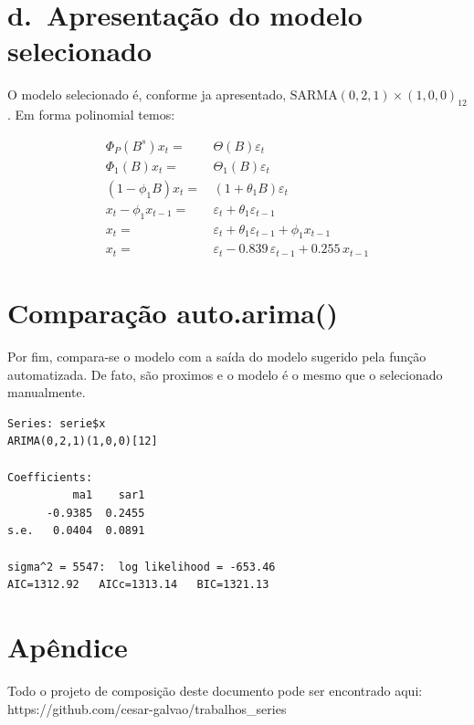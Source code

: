 \documentclass[
  letterpaper,
  DIV=11,
  numbers=noendperiod]{scrartcl}
\begin{document}
\hypertarget{d.-apresentauxe7uxe3o-do-modelo-selecionado}{%
\section{d.~Apresentação do modelo
selecionado}\label{d.-apresentauxe7uxe3o-do-modelo-selecionado}}

O modelo selecionado é, conforme ja apresentado,
\(\text{SARMA}(0,2,1)\times(1,0,0)_{12}\). Em forma polinomial temos:

\[
\begin{aligned}
  \Phi_P(B^s)x_t =& \, \Theta(B)\varepsilon_t \\
  \Phi_1(B)x_t =& \, \Theta_1(B)\varepsilon_t\\
  (1-\phi_1 B)x_t =& \, (1+\theta_1 B)\varepsilon_t \\
  x_t - \phi_1 x_{t-1} =& \, \varepsilon_t  + \theta_1 \varepsilon_{t-1} \\
  x_t  =& \, \varepsilon_t  + \theta_1 \varepsilon_{t-1} + \phi_1 x_{t-1}\\
  x_t  =& \, \varepsilon_t  -0.839 \, \varepsilon_{t-1} + 0.255 \, x_{t-1}
\end{aligned}
\]

\hypertarget{comparauxe7uxe3o-auto.arima}{%
\section{Comparação auto.arima()}\label{comparauxe7uxe3o-auto.arima}}

Por fim, compara-se o modelo com a saída do modelo sugerido pela função
automatizada. De fato, são proximos e o modelo é o mesmo que o
selecionado manualmente.

\begin{verbatim}
Series: serie$x 
ARIMA(0,2,1)(1,0,0)[12] 

Coefficients:
          ma1    sar1
      -0.9385  0.2455
s.e.   0.0404  0.0891

sigma^2 = 5547:  log likelihood = -653.46
AIC=1312.92   AICc=1313.14   BIC=1321.13
\end{verbatim}

\hypertarget{apuxeandice}{%
\section{Apêndice}\label{apuxeandice}}

Todo o projeto de composição deste documento pode ser encontrado aqui:
https://github.com/cesar-galvao/trabalhos\_series
\end{document}
